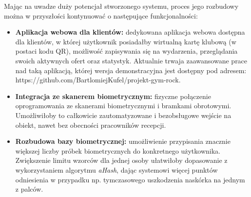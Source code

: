 Mając na uwadze duży potencjał stworzonego systemu, proces jego rozbudowy można w przyszłości kontynuować o następujące funkcjonalności:
\begin{itemize}
    \item \textbf{Aplikacja webowa dla klientów:} dedykowana aplikacja webowa dostępna dla klientów, w której użytkownik posiadałby wirtualną kartę klubową (w postaci kodu QR), możliwość zapisywania się na wydarzenia, przeglądania swoich aktywnych ofert oraz statystyk. Aktualnie trwaja zaawansowane prace nad taką aplikacją, której wersja demonstracyjna jest dostępny pod adresem: https://github.com/BartlomiejKufel/projekt-gym-rock.
    \item \textbf{Integracja ze skanerem biometrycznym:} fizyczne połączenie oprogramowania ze skanerami biometrycznymi i bramkami obrotowymi. Umożliwiłoby to całkowicie zautomatyzowane i bezobsługowe wejście na obiekt, nawet bez obecności pracowników recepcji.
    \item \textbf{Rozbudowa bazy biometrycznej:} umożliwienie przypisania znacznie większej liczby próbek biometrycznych do konkretnego użytkownika. Zwiększenie limitu wzorców dla jednej osoby ułatwiłoby dopasowanie z wykorzystaniem algorytmu \textit{aHash}, dając systemowi więcej punktów odniesienia w przypadku np. tymczasowego uszkodzenia naskórka na jednym z palców.
\end{itemize}


